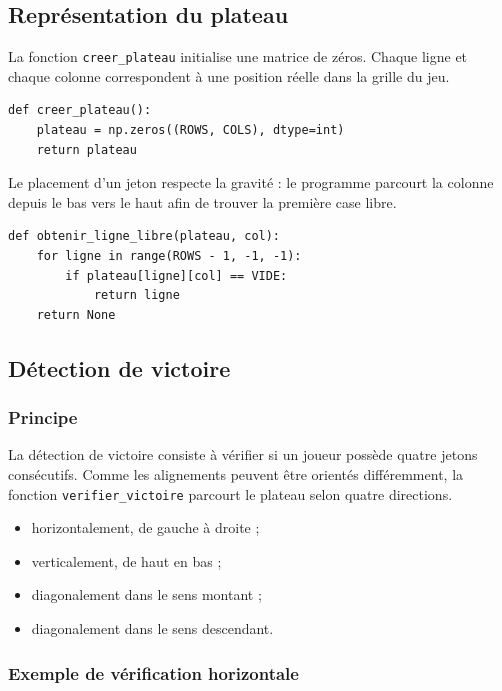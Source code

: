 \documentclass[12pt,a4paper]{article}
\begin{document}
\subsection{Représentation du plateau}

La fonction \texttt{creer\_plateau} initialise une matrice de zéros. Chaque ligne et chaque colonne correspondent à une position réelle dans la grille du jeu.

\begin{lstlisting}[style=pythonstyle, caption={Création du plateau}]
def creer_plateau():
    plateau = np.zeros((ROWS, COLS), dtype=int)
    return plateau
\end{lstlisting}

Le placement d'un jeton respecte la gravité : le programme parcourt la colonne depuis le bas vers le haut afin de trouver la première case libre.

\begin{lstlisting}[style=pythonstyle, caption={Recherche de la ligne libre dans une colonne}]
def obtenir_ligne_libre(plateau, col):
    for ligne in range(ROWS - 1, -1, -1):
        if plateau[ligne][col] == VIDE:
            return ligne
    return None
\end{lstlisting}


\subsection{Détection de victoire}

\subsubsection{Principe}

La détection de victoire consiste à vérifier si un joueur possède quatre jetons consécutifs. Comme les alignements peuvent être orientés différemment, la fonction \texttt{verifier\_victoire} parcourt le plateau selon quatre directions.

\begin{itemize}[leftmargin=1.2cm]
    \item horizontalement, de gauche à droite ;
    \item verticalement, de haut en bas ;
    \item diagonalement dans le sens montant ;
    \item diagonalement dans le sens descendant.
\end{itemize}

\subsubsection{Exemple de vérification horizontale}
\end{document}
